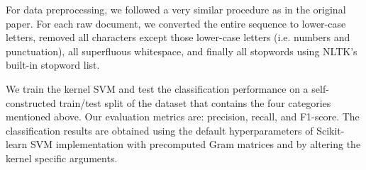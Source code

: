 For data preprocessing, we followed a very similar procedure as in the original paper. For each raw document, we converted the entire sequence to lower-case letters, removed all characters except those lower-case letters (i.e. numbers and punctuation), all superfluous whitespace, and finally all stopwords using NLTK's built-in  stopword list.

We train the kernel SVM and test the classification performance on a self-constructed train/test split of the dataset that contains the four categories mentioned above. Our evaluation metrics are: precision, recall, and F1-score. The classification results are obtained using the default hyperparameters of Scikit-learn SVM implementation with precomputed Gram matrices and by altering the kernel specific arguments.
